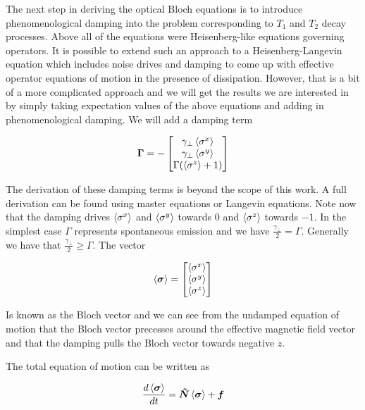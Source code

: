 \documentclass[12pt]{article}
\newcommand{\ddt}[1]{\frac{d #1}{dt}}
\newcommand{\bv}[1]{\boldsymbol{#1}}
\begin{document}
The next step in deriving the optical Bloch equations is to introduce phenomenological damping into the problem corresponding to $T_1$ and $T_2$ decay processes. Above all of the equations were Heisenberg-like equations governing operators. It is possible to extend such an approach to a Heisenberg-Langevin equation which includes noise drives and damping to come up with effective operator equations of motion in the presence of dissipation. However, that is a bit of a more complicated approach and we will get the results we are interested in by simply taking expectation values of the above equations and adding in phenomenological damping. We will add a damping term

\begin{align}
\bv{\Gamma} = 
-\begin{bmatrix}
\gamma_{\perp}\Braket{\sigma^x}\\
\gamma_{\perp}\Braket{\sigma^y}\\
\Gamma (\Braket{\sigma^z} + 1)
\end{bmatrix}
\end{align}

The derivation of these damping terms is beyond the scope of this work. A full derivation can be found using master equations or Langevin equations. Note now that the damping drives $\Braket{\sigma^x}$ and $\Braket{\sigma^y}$ towards $0$ and $\Braket{\sigma^z}$ towards $-1$.
In the simplest case $\Gamma$ represents spontaneous emission and we have $\frac{\gamma_{\perp}}{2} = \Gamma$. Generally we have that $\frac{\gamma_{\perp}}{2} \ge \Gamma$. The vector

\begin{align}
\Braket{\bv{\sigma}} = \begin{bmatrix}
\Braket{\sigma^x}\\
\Braket{\sigma^y}\\
\Braket{\sigma^z}
\end{bmatrix}
\end{align}

Is known as the Bloch vector and we can see from the undamped equation of motion that the Bloch vector precesses around the effective magnetic field vector and that the damping pulls the Bloch vector towards negative $z$.


The total equation of motion can be written as

\begin{align}
\ddt{\Braket{\bv{\sigma}}} = \bv{\tilde{N}} \Braket{\bv{\sigma}} + \bv{f}
\end{align}
\end{document}

